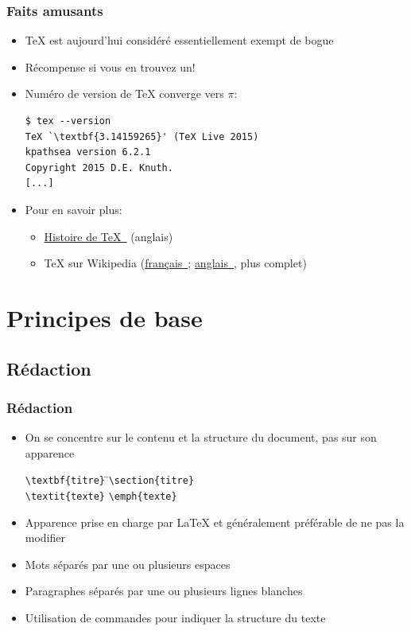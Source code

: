 \documentclass[aspectratio=54,10pt,xcolor=x11names]{beamer}
\newcommand{\link}[2]{\href{#1}{#2~\raisebox{-0.2ex}{\faExternalLink}}}
\theoremstyle{example}
\begin{document}
\begin{frame}[fragile=singleslide]
  \frametitle{Faits amusants}
  \begin{itemize}
  \item {\TeX} est aujourd'hui considéré essentiellement exempt de bogue
  \item Récompense si vous en trouvez un!
  \item Numéro de version de {\TeX} converge vers $\pi$:
\begin{lstlisting}
$ tex --version
TeX `\textbf{3.14159265}' (TeX Live 2015)
kpathsea version 6.2.1
Copyright 2015 D.E. Knuth.
[...]
\end{lstlisting} %
  \item Pour en savoir plus:
    \begin{itemize}
    \item \link{http://www.tug.org/whatis.html}{Histoire de \TeX} (anglais)
    \item {\TeX} sur Wikipedia
      (\link{http://fr.wikipedia.org/wiki/TeX}{français};
      \link{http://en.wikipedia.org/wiki/TeX}{anglais}, plus complet)
    \end{itemize}
  \end{itemize}
\end{frame}


\section{Principes de base}

\subsection{Rédaction}

\begin{frame}[fragile=singleslide]
  \frametitle{Rédaction}
  \begin{itemize}
  \item On se concentre sur le contenu et la \alert{structure} du
    document, pas sur son \alert{apparence}
      \bigskip
      \begin{tabbing}
        \verb=\textbf{titre}= \qquad\= \faArrowRight \qquad\= \verb|\section{titre}| \\[6pt]
        \verb|\textit{texte}| \> \faArrowRight \> \verb|\emph{texte}|
      \end{tabbing}
      \bigskip
  \item Apparence prise en charge par {\LaTeX} et généralement préférable de ne
    pas la modifier
  \item Mots séparés par une ou plusieurs \alert{espaces}
  \item Paragraphes séparés par une ou plusieurs \alert{lignes blanches}
  \item Utilisation de \alert{commandes} pour indiquer la structure du texte
  \end{itemize}
\end{frame}
\end{document}
